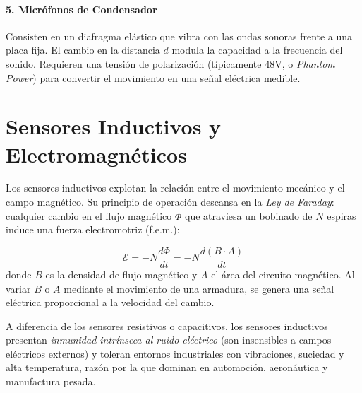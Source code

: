 
\paragraph{5. Micrófonos de Condensador}
Consisten en un diafragma elástico que vibra con las ondas sonoras frente a una placa fija. El cambio en la distancia $d$ modula la capacidad a la frecuencia del sonido. Requieren una tensión de polarización (típicamente \unit{48}{V}, o \textit{Phantom Power}) para convertir el movimiento en una señal eléctrica medible.



\section{Sensores Inductivos y Electromagnéticos}\label{sec:inductivos}

Los sensores inductivos explotan la relación entre el movimiento mecánico y el campo magnético. Su principio de operación descansa en la \emph{Ley de Faraday}: cualquier cambio en el flujo magnético $\Phi$ que atraviesa un bobinado de $N$ espiras induce una fuerza electromotriz (f.e.m.):

\begin{equation}
  \mathcal{E} = -N \frac{d\Phi}{dt} = -N \frac{d(B \cdot A)}{dt}
\end{equation}
donde $B$ es la densidad de flujo magnético y $A$ el área del circuito magnético. Al variar $B$ o $A$ mediante el movimiento de una armadura, se genera una señal eléctrica proporcional a la velocidad del cambio.

A diferencia de los sensores resistivos o capacitivos, los sensores inductivos presentan \emph{inmunidad intrínseca al ruido eléctrico} (son insensibles a campos eléctricos externos) y toleran entornos industriales con vibraciones, suciedad y alta temperatura, razón por la que dominan en automoción, aeronáutica y manufactura pesada.

